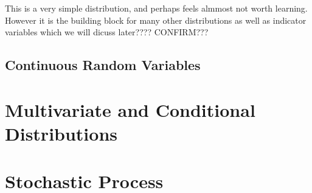 \documentclass{report}
\begin{document}
This is a very simple distribution, and perhaps feels almmost not worth learning. However it is the building block for many other distributions as well as indicator variables which we will dicuss later???? \todo CONFIRM???


\section{Continuous Random Variables}

\chapter{Multivariate and Conditional Distributions}

\chapter{Stochastic Process}
\end{document}
